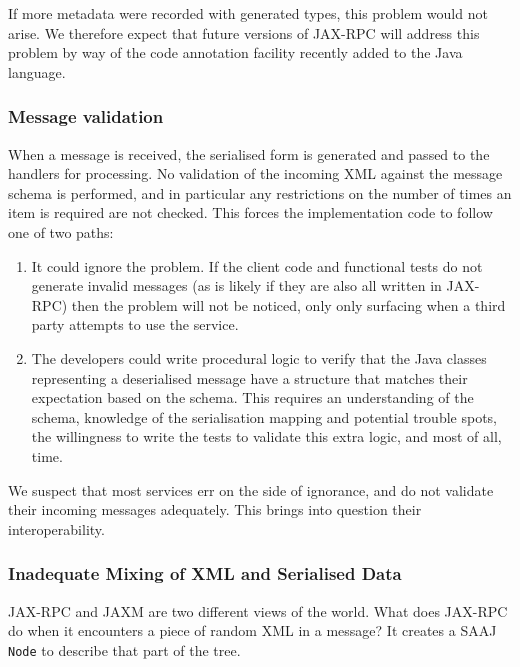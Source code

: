 If more metadata were recorded with generated types, this problem would not
arise. We therefore expect that future versions of JAX-RPC will address this 
problem by way of the code annotation facility recently added to the Java
language. 

\subsubsection{Message validation}
\label{objections:o-x:validation}

When a message is received, the serialised form is generated and
passed to the handlers for processing. No validation of the incoming
XML against the message schema is performed, and in particular any
restrictions on the number of times an item is required are not
checked. This forces the implementation code to follow one of two
paths:
\begin{enumerate}

\item It could ignore the problem. If the client code and functional
tests do not generate invalid messages (as is likely if they are also
all written in JAX-RPC) then the problem will not be noticed, only
only surfacing when a third party attempts to use the service.

\item The developers could write procedural logic to verify that
the Java classes representing a deserialised message have a
structure that matches their expectation based on the schema. This
requires an understanding of the schema, knowledge of the
serialisation mapping and potential trouble spots, the willingness to
write the tests to validate this extra logic, and most of all, time.

\end{enumerate}

We suspect that most services err on the side of ignorance, and do not
validate their incoming messages adequately. This brings into question
their interoperability.

\subsubsection{Inadequate Mixing of XML and Serialised Data}
\label{objections:o-x:mixing}

JAX-RPC and JAXM are two different views of the world. What does JAX-RPC
do when it encounters a piece of random XML in a message? It creates a
SAAJ {\tt Node} to describe that part of the tree.

